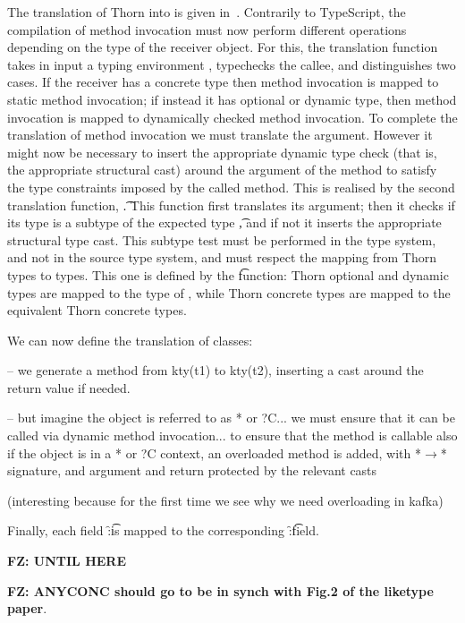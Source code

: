 \documentclass[acmlarge, anonymous, authordraft]{acmart}
\newcommand{\FZ}[1]{\textbf{FZ: #1}}
\begin{document}
 The translation of Thorn into \kafka is given in~.  Contrarily to TypeScript, the compilation of method invocation must now perform different operations depending on the type of the receiver object. For this, the translation function \Env takes in input a typing environment \Env, typechecks the callee, and distinguishes two cases.  If the receiver has a concrete type then method invocation is mapped to static method invocation; if instead it has optional or dynamic type, then method invocation is mapped to dynamically checked method invocation.  To complete the translation of method invocation we must translate the argument.  However it might now be necessary to insert the appropriate dynamic type check (that is, the appropriate structural cast) around the argument of the method to satisfy the type constraints imposed by the called method.  This is realised by the second translation function, \Env\t.  This function first translates its argument; then it checks if its type is a subtype of the expected type \t, and if not it inserts the appropriate structural type cast.  This subtype test must be performed in the \kafka type system, and not in the source type system, and must respect the mapping from Thorn types to \kafka types.  This one is defined by the \kty\t function: Thorn optional and dynamic types are mapped to the \any type of \kafka, while Thorn concrete types are mapped to the equivalent Thorn concrete types.
 
We can now define the translation of classes: 

  -- we generate a method from kty(t1) to kty(t2), inserting a cast around the return value if needed. 

 --  but imagine the object is referred to as * or ?C...  we must ensure that it can be called via dynamic method invocation...   to ensure that the method is callable also if the object is in a * or ?C context,  an overloaded method is added, with *\(\to\)* signature, and argument and return protected by the relevant casts

(interesting because for the first time we see why we need overloading in kafka)

Finally, each field \f:\t is mapped to the corresponding \f:\kty\t field.
 
 

 
 \FZ{UNTIL HERE}


 

 \FZ{ANYCONC should go to be in synch with Fig.2 of the liketype paper}.
\end{document}
